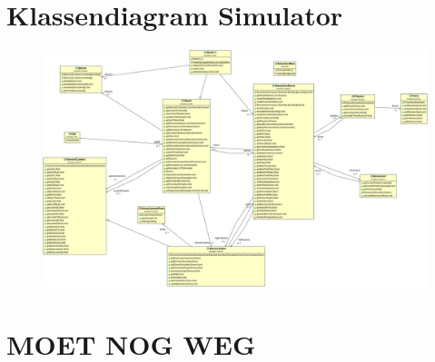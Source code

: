 \documentclass[tt]{penoverslag}
\begin{document}
\section{Klassendiagram Simulator} \label{App:KlassendiagramSimulator}

\begin{figure}[h]
	\begin{center}
		\includegraphics[width=\textwidth]{KlassendiagramSimulator.png}
	\end{center}
\end{figure}

\section{MOET NOG WEG}

\end{document}
